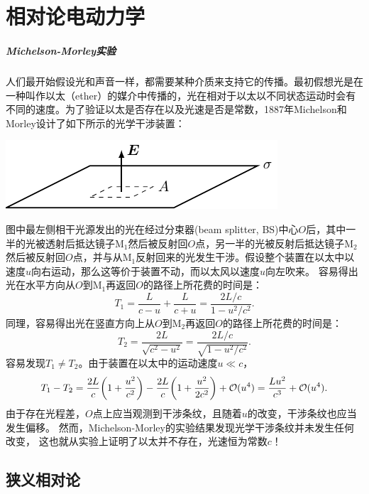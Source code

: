 \chapter{相对论电动力学}
\label{chap:relativistic electromagnetic}
\paragraph{Michelson-Morley实验}
人们最开始假设光和声音一样，都需要某种介质来支持它的传播。最初假想光是在一种叫作以太（ether）的媒介中传播的，光在相对于以太以不同状态运动时会有不同的速度。为了验证以太是否存在以及光速是否是常数，1887年Michelson和Morley设计了如下所示的光学干涉装置：
\begin{center}
	\includegraphics[page=30]{figures/tikz/layouts.pdf}
	\label{fig:Michelson-Morley}
\end{center}
图中最左侧相干光源发出的光在经过分束器(beam splitter, BS)中心$O$后，其中一半的光被透射后抵达镜子M$_1$然后被反射回$O$点，另一半的光被反射后抵达镜子M$_2$然后被反射回$O$点，并与从M$_1$反射回来的光发生干涉。假设整个装置在以太中以速度$u$向右运动，那么这等价于装置不动，而以太风以速度$u$向左吹来。%
容易得出光在水平方向从$O$到M$_1$再返回$O$的路径上所花费的时间是：
\[
	T_1=\frac L{c-u}+\frac L{c+u}=\frac{2L/c}{1-u^2/c^2}.
\]
同理，容易得出光在竖直方向上从$O$到M$_2$再返回$O$的路径上所花费的时间是：
\[
	T_2=\frac{2L}{\sqrt{c^2-u^2}}=\frac{2L/c}{\sqrt{1-u^2/c^2}}.
\]
容易发现$T_1\neq T_2$。由于装置在以太中的运动速度$u\ll c$，%
\[
	T_1-T_2=\frac{2L}c\biggl(1+\frac{u^2}{c^2}\biggr)-\frac{2L}c\biggl(1+\frac{u^2}{2c^2}\biggr)+\mathcal O(u^4)=\frac{Lu^2}{c^3}+\mathcal O(u^4).
\]
由于存在光程差，$O$点上应当观测到干涉条纹，且随着$u$的改变，干涉条纹也应当发生偏移。
然而，Michelson-Morley的实验结果发现光学干涉条纹并未发生任何改变，%
这也就从实验上证明了以太并不存在，光速恒为常数$c$！
\section{狭义相对论}


